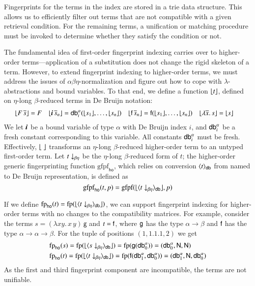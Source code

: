 Fingerprints for the terms in the index are stored in a trie data structure.
This allows us to efficiently filter out terms that are not compatible with a given
retrieval condition. For the remaining terms, a unification or matching
procedure must be invoked to determine whether they satisfy the condition or not.

The fundamental idea of first-order fingerprint indexing carries over to
higher-order terms---application of a substitution does not change the rigid skeleton of a term.
However, to extend fingerprint indexing to
higher-order terms, we must address the issues of $\alpha\beta\eta$-normalization and figure out how to cope with $\lambda$-abstractions and
bound variables. To that end, we define a function $\lfloor t\rfloor$, defined on
$\eta$-long $\beta$-reduced terms in De Bruijn \cite{db-75-dbindices} notation:
\begin{align*}
& \lfloor F \, \overline{s}\rfloor = F
&& \lfloor\textbf{\textit{i}} \, \overline{s}_n \rfloor = \textsf{db}_{i}^{\alpha}(\lfloor s_1\rfloor, \ldots, \lfloor s_n\rfloor)
&& \lfloor\mathsf{f} \, \overline{s}_n \rfloor = \mathsf{f}(\lfloor s_1\rfloor, \ldots, \lfloor s_n\rfloor) &&
\lfloor\lambda \overline{x}. \, s  \rfloor = \lfloor s\rfloor
\end{align*}
We let $\textbf{\textit{i}}$ be a bound variable of type $\alpha$ with De Bruijn index $i$,
and $\textsf{db}_{i}^{\alpha}$ be a fresh constant corresponding to this variable. All constants
$\textsf{db}_{i}^{\alpha}$ must be fresh. 
Effectively, $\lfloor\;\rfloor$ transforms an $\eta$-long $\beta$-reduced higher-order term to an untyped first-order term. Let $\nf{t}{\beta\eta}$ be
the $\eta$-long $\beta$-reduced form of $t$; the higher-order generic
fingerprinting function $\text{gfpf}_\textsf{ho}$, which relies on conversion $\langle t \rangle_\textsf{db}$ from
named to De Bruijn representation, is defined as
\[
  \text{gfpf}_\textsf{ho}(t,p) =
    \text{gfpf}(\hotofo{\nametodb{\nf{t}{\beta\eta}}}, p)
\]

If we define $\text{fp}_\textsf{ho}(t) =
\text{fp}(\hotofo{\nametodb{\nf{t}{\beta\eta}}})$, we can support fingerprint indexing
for higher-order terms with no changes to the compatibility matrices. For example,
consider the terms $s = (\lambda x y. \, x \, y) \, \textsf{g}$ and $t = \mathsf{f}$,
where $\mathsf{g}$ has the type $\alpha \rightarrow \beta$ and $\mathsf{f}$ has the
type $\alpha \rightarrow \alpha \rightarrow \beta$. 
For the tuple of
positions $(1, 1.1.1, 2)$ we get
\begin{align*}
  & \text{fp}_\textsf{ho}(s) =
    \text{fp}(\hotofo{\nametodb{\nf{s}{\beta\eta}}}) =
    \text{fp}(\cst{g}(\cstdba{0})) = 
    (\cstdba{0}, \NN, \NN) \\
  & \text{fp}_\textsf{ho}(t) =
   \text{fp}(\hotofo{\nametodb{\nf{t}{\beta\eta}}}) =
    \text{fp}(\cst{f}(\cstdba{1}, \cstdba{0})) = 
    (\cstdba{1}, \NN, \cstdba{0})
\end{align*}
As the first and third fingerprint component are incompatible, the terms are not unifiable.

